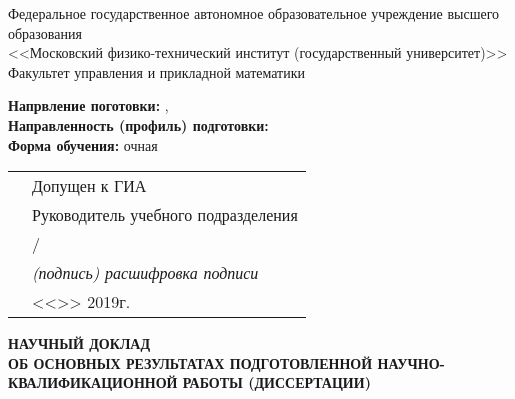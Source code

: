 \thispagestyle{empty}
\begin{center}
Федеральное государственное автономное образовательное учреждение высшего
образования \\
<<Московский физико-технический институт (государственный университет)>> \\
Факультет управления и прикладной математики \\
\end{center}

\vspace{0pt plus1fill}
\begin{small}
\begin{flushleft}
\textbf {Напрвление поготовки:} \thesisSpecialtyNumber, \thesisSpecialtyTitle \\
\textbf {Направленность (профиль) подготовки:} \thesisSpecialtyTwoTitle \\
\textbf {Форма обучения:} очная
\end{flushleft}

\begin{flushright}
  \begin{tabularx}{\textwidth}{XX}
    &Допущен к ГИА \\
    &Руководитель учебного подразделения \\
    &\underline{\hspace{3cm}}/\underline{\hspace{4cm}} \\
    &\hspace{1cm}\textit {(подпись) расшифровка подписи} \\
    & <<\underline {\hspace{1cm}}>> \underline {\hspace{3cm}} 2019г.
  \end{tabularx}
\end{flushright}

\vspace{0pt plus3fill}
\begin{center}
\textbf {НАУЧНЫЙ ДОКЛАД} \\
\textbf {ОБ ОСНОВНЫХ РЕЗУЛЬТАТАХ ПОДГОТОВЛЕННОЙ НАУЧНО-КВАЛИФИКАЦИОННОЙ РАБОТЫ (ДИССЕРТАЦИИ)}

\vspace{0pt plus2fill}

\textbf {\thesisTitle}
\end{center}


\end{small}

